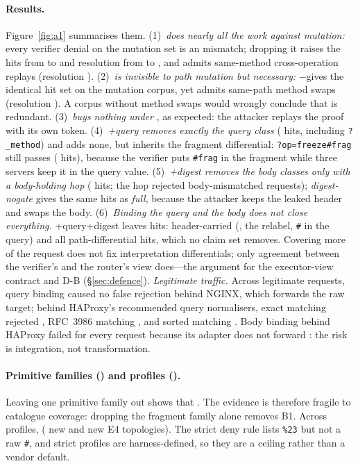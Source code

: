 \paragraph{Results.} Figure~\ref{fig:a1} summarises them.
(1)~\emph{\htu does nearly all the work against mutation:} every verifier
denial on the mutation set is an \htu mismatch; dropping it raises the hits
from \AblOneHitsFull{} to \AblOneHitsNoHtu{} and resolution from
\AblOneResFull{} to \AblOneResNoHtu{}, and admits \AblOneSwapNoHtu{}
same-method cross-operation replays (resolution \AblOneSwapResNoHtu{}).
(2)~\emph{\htm is invisible to path mutation but necessary:} $-$\htm gives the
identical hit set on the mutation corpus, yet admits \AblOneSwapNoHtm{}
same-path method swaps (resolution \AblOneSwapResNoHtm{}). A corpus without
method swaps would wrongly conclude that \htm is redundant.
(3)~\emph{\ath buys nothing under \Aleak}, as expected: the attacker replays the
proof with its own token.
(4)~\emph{+query removes exactly the query class} (\AblOneQueryRemoved{} hits,
including \texttt{?\_method}) and adds none, but inherits the fragment
differential: \texttt{?op=freeze\#frag} still passes (\AblOneFragQuery{}
hits), because the verifier puts \texttt{\#frag} in the fragment while three
servers keep it in the query value.
(5)~\emph{+digest removes the body classes only with a body-holding hop}
(\AblOneDigestRemoved{} hits; the hop rejected \AblOneGateDeny{}
body-mismatched requests); \emph{digest-nogate} gives the same hits as
\emph{full}, because the attacker keeps the leaked header and swaps the body.
(6)~\emph{Binding the query and the body does not close everything.}
+query+digest leaves \AblOneHitsQueryDigest{} hits: header-carried \GA
(, the  relabel, \texttt{\#} in
the query) and all \AblOneGTwoSurvive{} \GB path-differential hits, which no
claim set removes. Covering more of the request does not fix interpretation
differentials; only agreement between the verifier's and the router's view
does---the argument for the executor-view contract and D-B
(\S\ref{sec:defence}).
\emph{Legitimate traffic.} Across \AblOneLegitN{} legitimate requests,
query binding caused no false rejection behind NGINX, which forwards the raw
target; behind HAProxy's recommended query normalisers, exact matching
rejected \AblOneLegitFRHapExact{}, RFC~3986 matching
\AblOneLegitFRHapRfc{}, and sorted matching \AblOneLegitFRHapSorted{}. Body
binding behind HAProxy failed for every request because its adapter does not
forward : the risk is integration, not transformation.

\paragraph{Primitive families () and profiles ().}
Leaving one primitive family out shows that \AblFourResult{}. The \GB evidence
is therefore fragile to catalogue coverage: dropping the fragment family alone
removes B1. Across profiles, \AblFiveResult{} (\AblFiveGTwoTopos{} new \GB and
\AblFiveEFourTopos{} new E4 topologies). The strict deny rule lists
\texttt{\%23} but not a raw \texttt{\#}, and strict profiles are
harness-defined, so they are a ceiling rather than a vendor default.
